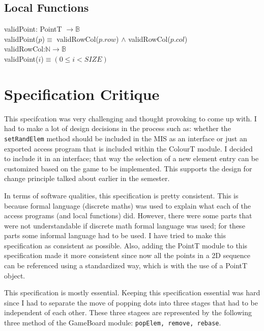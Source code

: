 \documentclass[12pt]{article}
\begin{document}
\newpage
\subsection*{Local Functions}

\noindent validPoint: PointT $\rightarrow \mathbb{B}$\\
validPoint($p$)$ \equiv $ validRowCol($p.row$) $\land$ validRowCol($p.col$) \\

\noindent validRowCol:$\mathbb{N} \rightarrow \mathbb{B}$\\
validPoint($i$)$ \equiv (0 \le i < SIZE)$\\

\newpage

\section*{Specification Critique}

This specifcation was very challenging and thought provoking to come up with. I had to make a lot of design decisions in the process such as: whether the \verb|setRandElem| method should be included in the MIS as an interface or just an exported access program that is included within the ColourT module. I decided to include it in an interface; that way the selection of a new element entry can be customized based on the game to be implemented. This supports the design for change principle talked about earlier in the semester.

In terms of software qualities, this specification is pretty consistent. This is because formal language (discrete maths) was used to explain what each of the access programs (and local functions) did. However, there were some parts that were not understandable if discrete math formal language was used; for these parts some informal language had to be used. I have tried to make this specification as consistent as possible. Also, adding the PointT module to this specification made it more consistent since now all the points in a 2D sequence can be referenced using a standardized way, which is with the use of a PointT object.

This specification is mostly essential. Keeping this specification essential was hard since I had to separate the move of popping dots into three stages that had to be independent of each other. These three stagees are represented by the following three method of the GameBoard module: \verb|popElem, remove, rebase|.
\end{document}

